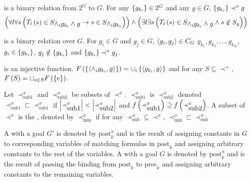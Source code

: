 \begin{defi}
 is a binary relation from $2^G$ to $G$. For any $\left\{ g_{k_i}\right\}\in 2^G$ and any $g\in G$, $\left\{ g_{k_i}\right\}\prec^x g$ \iffTx{}
\begin{equation}
\left( \forall l\forall s\left( T_l\left(s\right)\in S_{\displaystyle\wedge_ig_{k_i}\wedge g}\rightarrow s\in S_{\displaystyle\wedge_ig_{k_i}}\right)\right)\wedge\left( \exists l\exists s\left( T_l\left(s\right)\in S_{\displaystyle\wedge_ig_{k_i}\wedge g}\wedge s\notin S_g\right)\right)
\end{equation}
\cite{conf/ijcai/ChengI89}
\end{defi}

\begin{defi}[$C_G$]
 is a binary relation over $G$. For $g_i\in G$ and $g_j\in G$, $\left\langle g_i,g_j\right\rangle\in C_G$  \iffTx{} \teTx{} $g_{k_1},g_{k_2},\ldots,g_{k_m}$, \stTx{} $g_i\in\left\{ g_{k_i}\right\}$, $g_j\notin\left\{ g_{k_i}\right\}$ and $\left\{ g_{k_i}\right\}\prec^x g_j$.
\cite{conf/ijcai/ChengI89}
\end{defi}

\begin{defi}
 is an injective function. $F\left(\left\{ \left\langle \wedge_ig_{k_i},g\right\rangle\right\}\right)=\displaystyle\cup_i\left\{ \left\langle g_{k_i},g\right\rangle\right\}$ and for any $S\subseteq\prec^+$, $F\left(S\right)=\displaystyle\cup_{e\in S}F\left(\left\{ e\right\}\right)$.
\cite{conf/ijcai/ChengI89}
\end{defi}

\begin{defi}
Let $\prec_{\mbox{sub1}}^x$ and $\prec_{\mbox{sub2}}^x$ be subsets of $\prec^x$. $\prec_{\mbox{sub1}}^x$ is  $\prec_{\mbox{sub2}}^x$ denoted $\prec_{\mbox{sub1}}^x\sqsubset\prec_{\mbox{sub1}}^x$ if $\left|\prec_{\mbox{sub1}}^x\right|<\left|\prec_{\mbox{sub2}}^x\right|$ and $f\left(\prec_{\mbox{sub1}}^x\right)\supseteq f\left(\prec_{\mbox{sub2}}^x\right)$. A subset of $\prec^x$ is the , denoted by $\prec_{\mbox{min}}^x$ if for any $\prec_{\mbox{sub}}^x\subseteq\prec^x$, $\prec_{\mbox{min}}^x\sqsubset\prec_{\mbox{sub}}^x$
\cite{conf/ijcai/ChengI89}
\end{defi}

\begin{defi}
A  with a goal $G'$ is denoted by $\mbox{post}_k^{\pi}$ and is the result of assigning constants in $G$ to corresponding variables of matching formulas in $\mbox{post}_k$ and assigning arbitrary constants to the rest of the variables. A  with a goal $G$ is denoted by $\mbox{post}_k^{\pi}$ and is the result of passing the binding from $\mbox{post}_k$ to $\mbox{prec}_k$ and assigning arbitrary constants to the remaining variables.
\cite{conf/ijcai/ChengI89}
\end{defi}

